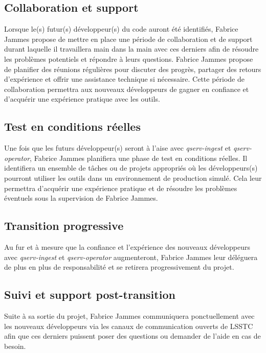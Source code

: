 \documentclass[french] {article}
\begin{document}
\subsection{Collaboration et support}

Lorsque le(s) futur(s) développeur(s) du code auront été identifiés, Fabrice Jammes propose de mettre en place une période de collaboration et de support durant laquelle il travaillera main dans la main
avec ces derniers afin de résoudre les problèmes potentiels et répondre à leurs questions. Fabrice Jammes propose de planifier des réunions régulières pour discuter des progrès, partager des retours
d'expérience et offrir une assistance technique si nécessaire. Cette période de collaboration permettra aux nouveaux développeurs de gagner en confiance et d'acquérir une expérience pratique avec les outils.

\subsection{Test en conditions réelles}

Une fois que les futurs développeur(s) seront à l'aise avec \textit{qserv-ingest} et \textit{qserv-operator}, Fabrice Jammes planifiera une phase de test en conditions réelles. Il identifiera un
ensemble de tâches ou de projets appropriés où les développeurs(s) pourront utiliser les outils dans un environnement de production simulé. Cela leur permettra d'acquérir une expérience pratique
et de résoudre les problèmes éventuels sous la supervision de Fabrice Jammes.

\subsection{Transition progressive}

Au fur et à mesure que la confiance et l'expérience des nouveaux développeurs avec \textit{qserv-ingest} et \textit{qserv-operator} augmenteront, Fabrice Jammes leur déléguera de plus en plus de
responsabilité et se retirera progressivement du projet.

\subsection{Suivi et support post-transition}

Suite à sa sortie du projet, Fabrice Jammes communiquera ponctuellement avec les nouveaux développeurs via les canaux de communication ouverts de LSSTC afin que ces derniers puissent poser
des questions ou demander de l'aide en cas de besoin.
\end{document}

